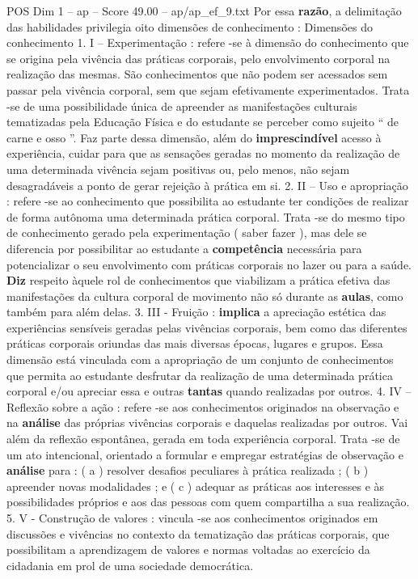 \begin{textsample}{POS Dim 1 – ap – Score 49.00 – ap/ap\_ef\_9.txt}
Por essa \textbf{razão}, a delimitação das habilidades privilegia oito dimensões de conhecimento : Dimensões do conhecimento 1.
I – Experimentação : refere -se à dimensão do conhecimento que se origina pela vivência das práticas corporais, pelo envolvimento corporal na realização das mesmas.
São conhecimentos que não podem ser acessados sem passar pela vivência corporal, sem que sejam efetivamente experimentados.
Trata -se de uma possibilidade única de apreender as manifestações culturais tematizadas pela Educação Física e do estudante se perceber como sujeito “ de carne e osso ”.
Faz parte dessa dimensão, além do \textbf{imprescindível} acesso à experiência, cuidar para que as sensações geradas no momento da realização de uma determinada vivência sejam positivas ou, pelo menos, não sejam desagradáveis a ponto de gerar rejeição à prática em si. 2.
II – Uso e apropriação : refere -se ao conhecimento que possibilita ao estudante ter condições de realizar de forma autônoma uma determinada prática corporal.
Trata -se do mesmo tipo de conhecimento gerado pela experimentação ( saber fazer ), mas dele se diferencia por possibilitar ao estudante a \textbf{competência} necessária para potencializar o seu envolvimento com práticas corporais no lazer ou para a saúde. \textbf{Diz} respeito àquele rol de conhecimentos que viabilizam a prática efetiva das manifestações da cultura corporal de movimento não só durante as \textbf{aulas}, como também para além delas. 3.
III - Fruição : \textbf{implica} a apreciação estética das experiências sensíveis geradas pelas vivências corporais, bem como das diferentes práticas corporais oriundas das mais diversas épocas, lugares e grupos.
Essa dimensão está vinculada com a apropriação de um conjunto de conhecimentos que permita ao estudante desfrutar da realização de uma determinada prática corporal e/ou apreciar essa e outras \textbf{tantas} quando realizadas por outros. 4.
IV – Reflexão sobre a ação : refere -se aos conhecimentos originados na observação e na \textbf{análise} das próprias vivências corporais e daquelas realizadas por outros.
Vai além da reflexão espontânea, gerada em toda experiência corporal.
Trata -se de um ato intencional, orientado a formular e empregar estratégias de observação e \textbf{análise} para : ( a ) resolver desafios peculiares à prática realizada ; ( b ) apreender novas modalidades ; e ( c ) adequar as práticas aos interesses e às possibilidades próprios e aos das pessoas com quem compartilha a sua realização. 5.
V - Construção de valores : vincula -se aos conhecimentos originados em discussões e vivências no contexto da tematização das práticas corporais, que possibilitam a aprendizagem de valores e normas voltadas ao exercício da cidadania em prol de uma sociedade democrática.

\end{textsample}
